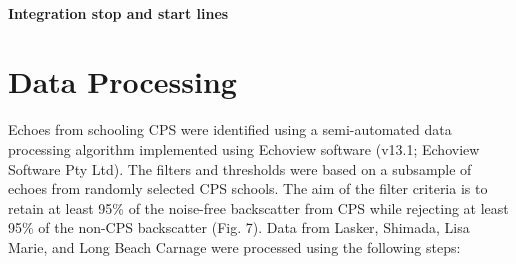 \documentclass[
  letterpaper,
  oneside,
  open=any]{scrbook}
\begin{document}
\subsubsection{Integration stop and start
lines}\label{integration-stop-and-start-lines}


\chapter{Data Processing}\label{data-processing}

Echoes from schooling CPS were identified using a semi-automated data
processing algorithm implemented using Echoview software (v13.1;
Echoview Software Pty Ltd). The filters and thresholds were based on a
subsample of echoes from randomly selected CPS schools. The aim of the
filter criteria is to retain at least 95\% of the noise-free backscatter
from CPS while rejecting at least 95\% of the non-CPS backscatter (Fig.
7). Data from Lasker, Shimada, Lisa Marie, and Long Beach Carnage were
processed using the following steps:
\end{document}
